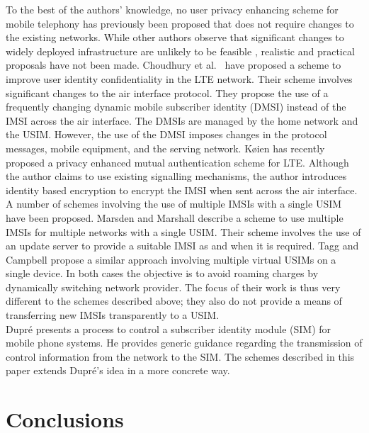\documentclass{acm_proc_article-sp}
\begin{document}
To the best of the authors' knowledge, no user privacy enhancing scheme for mobile telephony has previously been proposed that does not require changes to the existing networks. While other authors observe that significant changes to widely deployed infrastructure are unlikely to be feasible \cite{LTE-Identity-Privacy_Choudhury_2012,koien_2013_privacy}, realistic and practical proposals have not been made. Choudhury et al.\ \cite{LTE-Identity-Privacy_Choudhury_2012} have proposed a scheme to improve user identity confidentiality in the LTE network. Their scheme involves significant changes to the air interface protocol. They propose the use of a frequently changing dynamic mobile subscriber identity (DMSI) instead of the IMSI across the air interface. The DMSIs are managed by the home network and the USIM. However, the use of the DMSI imposes changes in the protocol messages, mobile equipment, and the serving network. K{\o}ien \cite{koien_2013_privacy} has recently proposed a privacy enhanced mutual authentication scheme for LTE. Although the author claims to use existing signalling mechanisms, the author introduces identity based encryption to encrypt the IMSI when sent across the air interface. \\

A number of schemes involving the use of multiple IMSIs with a single USIM have been proposed. Marsden and Marshall \cite{patent_multi-IMSI} describe a scheme to use multiple IMSIs for multiple networks with a single USIM. Their scheme involves the use of an update server to provide a suitable IMSI as and when it is required. Tagg and Campbell \cite{patent_identity} propose a similar approach involving multiple virtual USIMs on a single device. In both cases the objective is to avoid roaming charges by dynamically switching network provider. The focus of their work is thus very different to the schemes described above; they also do not provide a means of transferring new IMSIs transparently to a USIM.\\

Dupr\'e \cite{patent_controlled_SIM} presents a process to control a subscriber identity module (SIM) for mobile phone systems. He provides generic guidance regarding the transmission of control information from the network to the SIM. The schemes described in this paper extends Dupr\'e's idea in a more concrete way. 

\section{Conclusions} \label{Conclusion}
\end{document}
